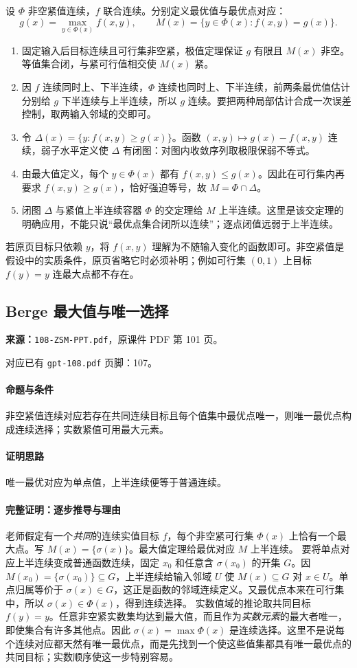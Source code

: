 设 $\Phi$ 非空紧值连续，$f$ 联合连续。分别定义最优值与最优点对应：
\[g(x)=\max_{y\in\Phi(x)}f(x,y),\qquad M(x)=\{y\in\Phi(x):f(x,y)=g(x)\}.\]
\begin{enumerate}
\item 固定输入后目标连续且可行集非空紧，极值定理保证 $g$ 有限且 $M(x)$ 非空。等值集合闭，与紧可行值相交使 $M(x)$ 紧。
\item 因 $f$ 连续同时上、下半连续，$\Phi$ 连续也同时上、下半连续，前两条最优值估计分别给 $g$ 下半连续与上半连续，所以 $g$ 连续。要把两种局部估计合成一次误差控制，取两输入邻域的交即可。
\item 令 $\Delta(x)=\{y:f(x,y)\ge g(x)\}$。函数 $(x,y)\mapsto g(x)-f(x,y)$ 连续，弱子水平定义使 $\Delta$ 有闭图：对图内收敛序列取极限保弱不等式。
\item 由最大值定义，每个 $y\in\Phi(x)$ 都有 $f(x,y)\le g(x)$。因此在可行集内再要求 $f(x,y)\ge g(x)$，恰好强迫等号，故 $M=\Phi\cap\Delta$。
\item 闭图 $\Delta$ 与紧值上半连续容器 $\Phi$ 的交定理给 $M$ 上半连续。这里是该交定理的明确应用，不能只说“最优点集合闭所以连续”；逐点闭值远弱于上半连续。
\end{enumerate}
若原页目标只依赖 $y$，将 $f(x,y)$ 理解为不随输入变化的函数即可。非空紧值是假设中的实质条件，原页省略它时必须补明；例如可行集 $(0,1)$ 上目标 $f(y)=y$ 连最大点都不存在。

\clearpage\subsection{Berge 最大值与唯一选择}
\textbf{来源：}\texttt{108-ZSM-PPT.pdf}，原课件 PDF 第 101 页。\par
对应已有 \texttt{gpt-108.pdf} 页脚：107。\par
\paragraph{命题与条件}非空紧值连续对应若存在共同连续目标且每个值集中最优点唯一，则唯一最优点构成连续选择；实数紧值可用最大元素。
\paragraph{证明思路}唯一最优对应为单点值，上半连续便等于普通连续。
\paragraph{完整证明：逐步推导与理由}

老师假定有一个\emph{共同}的连续实值目标 $f$，每个非空紧可行集 $\Phi(x)$ 上恰有一个最大点。写 $M(x)=\{\sigma(x)\}$。最大值定理给最优对应 $M$ 上半连续。
要将单点对应上半连续变成普通函数连续，固定 $x_0$ 和任意含 $\sigma(x_0)$ 的开集 $G$。因 $M(x_0)=\{\sigma(x_0)\}\subseteq G$，上半连续给输入邻域 $U$ 使 $M(x)\subseteq G$ 对 $x\in U$。单点归属等价于 $\sigma(x)\in G$，这正是函数的邻域连续定义。又最优点本来在可行集中，所以 $\sigma(x)\in\Phi(x)$，得到连续选择。
实数值域的推论取共同目标 $f(y)=y$。任意非空紧实数集均达到最大值，而且作为\emph{实数元素}的最大者唯一，即使集合有许多其他点。因此 $\sigma(x)=\max\Phi(x)$ 是连续选择。这里不是说每个连续对应都天然有唯一最优点，而是先找到一个使这些值集都具有唯一最优点的共同目标；实数顺序使这一步特别容易。


